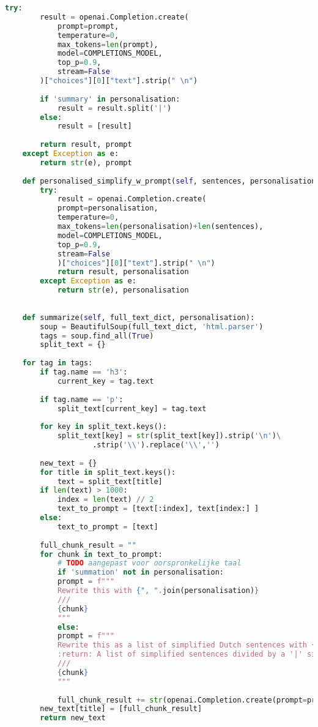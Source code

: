\begin{lstlisting}[language=Python, caption={Reader-klasse}, label={code:reader-klasse}]
	try:
		result = openai.Completion.create(
			prompt=prompt,
			temperature=0,
			max_tokens=len(prompt),
			model=COMPLETIONS_MODEL,
			top_p=0.9,
			stream=False
		)["choices"][0]["text"].strip(" \n")
	
		if 'summary' in personalisation:
			result = result.split('|')
		else:
			result = [result]
		
		return result, prompt
	except Exception as e:
		return str(e), prompt 
	
	def personalised_simplify_w_prompt(self, sentences, personalisation):
		try:
			result = openai.Completion.create(
			prompt=personalisation,
			temperature=0,
			max_tokens=len(personalisation)+len(sentences),
			model=COMPLETIONS_MODEL,
			top_p=0.9,
			stream=False
			)["choices"][0]["text"].strip(" \n")
			return result, personalisation
		except Exception as e:
			return str(e), personalisation
		
	
	def summarize(self, full_text_dict, personalisation):
		soup = BeautifulSoup(full_text_dict, 'html.parser')
		tags = soup.find_all(True)
		split_text = {}
	
	for tag in tags:
		if tag.name == 'h3':
			current_key = tag.text
	
		if tag.name == 'p':
			split_text[current_key] = tag.text
		
		for key in split_text.keys():
			split_text[key] = str(split_text[key]).strip('\n')\
					.strip('\\').replace('\\','')
	
		new_text = {}
		for title in split_text.keys():
			text = split_text[title]
		if len(text) > 1000:
			index = len(text) // 2
			text_to_prompt = [text[:index], text[index:] ]
		else:
			text_to_prompt = [text]
	
		full_chunk_result = ""
		for chunk in text_to_prompt:	
			# TODO aangepast voor oorspronkelijke taal
			if 'summation' not in personalisation:
			prompt = f"""
			Rewrite this with {", ".join(personalisation)}
			///
			{chunk}
			"""
			else:
			prompt = f"""
			Rewrite this as a list of simplified Dutch sentences with {", ".join(personalisation)}
			:return: A list of simplified sentences divided by a '|' sign
			///
			{chunk}
			"""
	
			full_chunk_result += str(openai.Completion.create(prompt=prompt,temperature=0,max_tokens=500,model=COMPLETIONS_MODEL,top_p=0.9,stream=False)["choices"][0]["text"].strip(" \n"))
		new_text[title] = [full_chunk_result]
		return new_text
\end{lstlisting}

